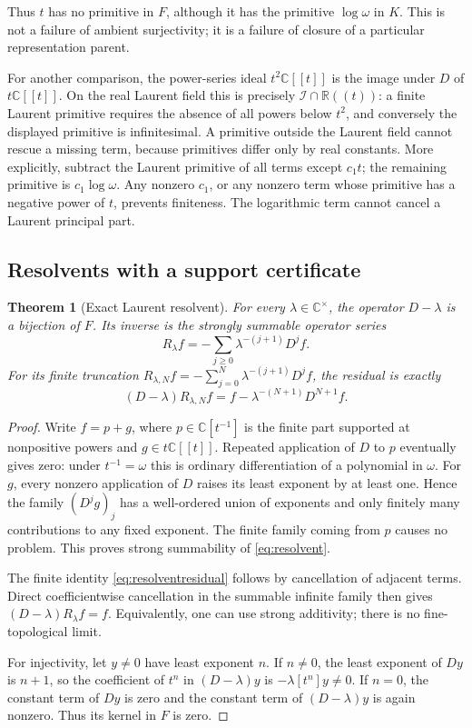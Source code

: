 \documentclass[11pt]{article}
\numberwithin{equation}{section}
\newtheorem{theorem}{Theorem}[section]
\theoremstyle{definition}
\newcommand{\R}{\mathbb R}
\newcommand{\C}{\mathbb C}
\newcommand{\II}{\mathcal I}
\begin{document}
Thus $t$ has no primitive in $F$, although it has the primitive
$\log\omega$ in $K$. This is not a failure of ambient surjectivity; it
is a failure of closure of a particular representation parent.

For another comparison, the power-series ideal $t^2\C[[t]]$ is the
image under $D$ of $t\C[[t]]$. On the real Laurent field this is precisely
$\II\cap\R((t))$: a finite Laurent primitive requires the absence of
all powers below $t^2$, and conversely the displayed primitive is
infinitesimal. A primitive outside the Laurent field cannot rescue a
missing term, because primitives differ only by real constants. More
explicitly, subtract the Laurent primitive of all terms except $c_1t$;
the remaining primitive is $c_1\log\omega$. Any nonzero $c_1$, or any
nonzero term whose primitive has a negative power of $t$, prevents
finiteness. The logarithmic term cannot cancel a Laurent principal part.

\subsection{Resolvents with a support certificate}
\begin{theorem}[Exact Laurent resolvent]\label{thm:resolvent}
For every $\lambda\in\C^\times$, the operator $D-\lambda$ is a
bijection of $F$. Its inverse is the strongly summable operator series
\begin{equation}\label{eq:resolvent}
 R_\lambda f=-\sum_{j\ge0}\lambda^{-(j+1)}D^j f.
\end{equation}
For its finite truncation
$R_{\lambda,N}f=-\sum_{j=0}^N\lambda^{-(j+1)}D^j f$, the residual is
exactly
\begin{equation}\label{eq:resolventresidual}
 (D-\lambda)R_{\lambda,N}f
   =f-\lambda^{-(N+1)}D^{N+1}f.
\end{equation}
\end{theorem}
\begin{proof}
Write $f=p+g$, where $p\in\C[t^{-1}]$ is the finite part supported at
nonpositive powers and $g\in t\C[[t]]$. Repeated application of $D$
to $p$ eventually gives zero: under $t^{-1}=\omega$ this is ordinary
differentiation of a polynomial in $\omega$. For $g$, every nonzero
application of $D$ raises its least exponent by at least one. Hence the
family $(D^jg)_j$ has a well-ordered union of exponents and only finitely
many contributions to any fixed exponent. The finite family coming from
$p$ causes no problem. This proves strong summability of
\eqref{eq:resolvent}.

The finite identity \eqref{eq:resolventresidual} follows by cancellation
of adjacent terms. Direct coefficientwise cancellation in the summable
infinite family then gives $(D-\lambda)R_\lambda f=f$. Equivalently,
one can use strong additivity; there is no fine-topological limit.

For injectivity, let $y\ne0$ have least exponent $n$. If $n\ne0$, the
least exponent of $Dy$ is $n+1$, so the coefficient of $t^n$ in
$(D-\lambda)y$ is $-\lambda[t^n]y\ne0$. If $n=0$, the constant
term of $Dy$ is zero and the constant term of $(D-\lambda)y$ is again
nonzero. Thus its kernel in $F$ is zero.
\end{proof}
\end{document}
